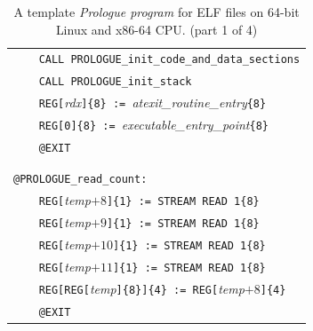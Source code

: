 \documentclass[10pt,twocolumn]{article}
\begin{document}
\begin{table}[!h]
\begin{center}
\begin{tabular}{l}
\texttt{~~~~CALL PROLOGUE\_init\_code\_and\_data\_sections}\\ %
\texttt{~~~~CALL PROLOGUE\_init\_stack}\\ %
\texttt{~~~~REG[}\textit{rdx}\texttt{]\{8\} :=
}\textit{atexit\_routine\_entry}\texttt{\{8\}}\\ %
\texttt{~~~~REG[0]\{8\} := }\textit{executable\_entry\_point}\texttt{\{8\}}\\ %
\texttt{~~~~@EXIT}\\ %
\\ \\


\texttt{@PROLOGUE\_read\_count:}\\ %
\texttt{~~~~REG[}\textit{temp}$ +8 $\texttt{]\{1\} := STREAM READ 1\{8\}}\\ %
\texttt{~~~~REG[}\textit{temp}$ +9 $\texttt{]\{1\} := STREAM READ 1\{8\}}\\ %
\texttt{~~~~REG[}\textit{temp}$ +10 $\texttt{]\{1\} := STREAM READ 1\{8\}}\\ %
\texttt{~~~~REG[}\textit{temp}$ +11 $\texttt{]\{1\} := STREAM READ 1\{8\}}\\ %
\texttt{~~~~REG[REG[}\textit{temp}\texttt{]\{8\}]\{4\} := REG[}\textit{temp}$ +8
$\texttt{]\{4\}}\\ %
\texttt{~~~~@EXIT}\\ %

\end{tabular}
\end{center}
\caption{A template \emph{Prologue program} for ELF files on 64-bit Linux and
x86-64 CPU. (part 1 of 4)} %
\label{tab:prologue:x86_64_Linux}
\end{table}
\end{document}
